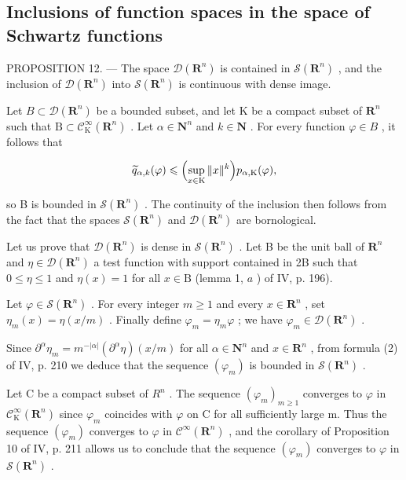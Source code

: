 \subsection{Inclusions of function spaces in the space of Schwartz functions}

PROPOSITION 12. — The space \(\mathcal{D}(\mathbf{R}^{n})\) is contained in \(\mathcal{S}(\mathbf{R}^{n})\) , and the inclusion of \(\mathcal{D}(\mathbf{R}^{n})\) into \(\mathcal{S}(\mathbf{R}^{n})\) is continuous with dense image.

Let \(B \subset \mathcal{D}(\mathbf{R}^{n})\) be a bounded subset, and let K be a compact subset of \(\mathbf{R}^{n}\) such that \(\mathrm{B} \subset \mathcal{C}_{\mathrm{K}}^{\infty}(\mathbf{R}^{n})\) . Let \(\alpha \in \mathbf{N}^{n}\) and \(k \in \mathbf{N}\) . For every function \(\varphi \in B\) , it follows that

\[
\widetilde {q} _ {\alpha , k} (\varphi) \leqslant \Bigl (\sup _ {x \in \mathrm{K}} \| x \| ^ {k} \Bigr) p _ {\alpha , \mathrm{K}} (\varphi),
\]

so B is bounded in \(\mathcal{S}(\mathbf{R}^{n})\) . The continuity of the inclusion then follows from the fact that the spaces \(\mathcal{S}(\mathbf{R}^{n})\) and \(\mathcal{D}(\mathbf{R}^{n})\) are bornological.

Let us prove that \(\mathcal{D}(\mathbf{R}^n)\) is dense in \(\mathcal{S}(\mathbf{R}^n)\) . Let B be the unit ball of \(\mathbf{R}^n\) and \(\eta \in \mathcal{D}(\mathbf{R}^n)\) a test function with support contained in 2B such that \(0 \leqslant \eta \leqslant 1\) and \(\eta(x) = 1\) for all \(x \in \mathrm{B}\) (lemma 1, \(a\) ) of IV, p. 196).

Let \(\varphi \in \mathcal{S}(\mathbf{R}^n)\) . For every integer \(m \geqslant 1\) and every \(x \in \mathbf{R}^n\) , set \(\eta_m(x) = \eta(x/m)\) . Finally define \(\varphi_m = \eta_m\varphi\) ; we have \(\varphi_m \in \mathcal{D}(\mathbf{R}^n)\) .

Since \(\partial^{\alpha}\eta_{m} = m^{-|\alpha|}(\partial^{\alpha}\eta)(x / m)\) for all \(\alpha \in \mathbf{N}^{n}\) and \(x\in \mathbf{R}^n\) , from formula (2) of IV, p. 210 we deduce that the sequence \((\varphi_{m})\) is bounded in \(\mathcal{S}(\mathbf{R}^n)\) .

Let C be a compact subset of \(R^{n}\) . The sequence \((\varphi_{m})_{m\geqslant1}\) converges to \(\varphi\) in \(\mathcal{C}_{\mathrm{K}}^{\infty}(\mathbf{R}^{n})\) since \(\varphi_{m}\) coincides with \(\varphi\) on C for all sufficiently large m. Thus the sequence \((\varphi_{m})\) converges to \(\varphi\) in \(\mathcal{C}^{\infty}(\mathbf{R}^{n})\) , and the corollary of Proposition 10 of IV, p. 211 allows us to conclude that the sequence \((\varphi_{m})\) converges to \(\varphi\) in \(\mathcal{S}(\mathbf{R}^{n})\) .

